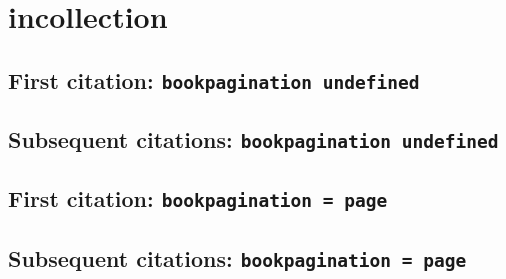 \documentclass[a4paper]{article}
\begin{document}
\section{incollection}

\subsection{First citation: \texttt{bookpagination undefined}}

\cite{attridge:1986}

\citereset
\cite[311]{attridge:1986}

\citereset
\cite[note]{attridge:1986}

\subsection{Subsequent citations: \texttt{bookpagination undefined}}

\cite{attridge:1986}

\cite[311]{attridge:1986}

\cite[note]{attridge:1986}

\subsection{First citation: \texttt{bookpagination = page}}

\cite{attridge:1986:a}

\citereset
\cite[311]{attridge:1986:a}

\citereset
\cite[note]{attridge:1986:a}

\subsection{Subsequent citations: \texttt{bookpagination = page}}

\cite{attridge:1986:a}

\cite[311]{attridge:1986:a}

\cite[note]{attridge:1986:a}

\printbibliography
\end{document}
